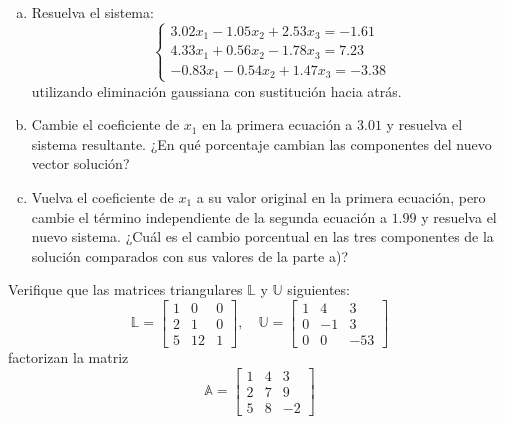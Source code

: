 \documentclass[11pt]{article}
\begin{document}
\begin{question} %
	\begin{enumerate}[a)]
		\item Resuelva el sistema:
		      \[ \begin{cases}
				      3.02 x_1 - 1.05 x_2 + 2.53 x_3 = -1.61 \\
				      4.33 x_1 + 0.56 x_2 - 1.78 x_3 = 7.23  \\
				      -0.83 x_1 - 0.54 x_2 + 1.47 x_3 = -3.38
			      \end{cases} \]
		      utilizando eliminación gaussiana con sustitución hacia atrás.
		\item Cambie el coeficiente de $x_1$ en la primera ecuación a $3.01$ y resuelva el sistema resultante. ¿En qué porcentaje cambian las componentes del nuevo vector solución?
		\item Vuelva el coeficiente de $x_1$ a su valor original en la primera ecuación, pero cambie el término independiente de la segunda ecuación a $1.99$ y resuelva el nuevo sistema. ¿Cuál es el cambio porcentual en las tres componentes de la solución comparados con sus valores de la parte a)?
	\end{enumerate}
\end{question}

\begin{question} %
	Verifique que las matrices triangulares $\mathbb{L}$ y $\mathbb{U}$ siguientes:
	\[ \mathbb{L} = \begin{bmatrix} 1 & 0 & 0 \\ 2 & 1 & 0 \\ 5 & 12 & 1 \end{bmatrix}, \quad \mathbb{U} = \begin{bmatrix} 1 & 4 & 3 \\ 0 & -1 & 3 \\ 0 & 0 & -53 \end{bmatrix} \]
	factorizan la matriz
	\[ \mathbb{A} = \begin{bmatrix} 1 & 4 & 3 \\ 2 & 7 & 9 \\ 5 & 8 & -2 \end{bmatrix} \]
\end{question}
\end{document}
